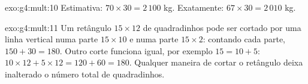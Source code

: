 \begin{solution}{exo:g4:mult:10}
Estimativa: $70 \times 30 = 2\,100$ kg. Exatamente:
$67 \times 30 = 2\,010$ kg.
\end{solution}

\begin{solution}{exo:g4:mult:11}
Um retângulo $15 \times 12$ de quadradinhos pode ser cortado por uma
linha vertical numa parte $15 \times 10$ e numa parte $15 \times 2$:
contando cada parte, $150 + 30 = 180$. Outro corte funciona igual,
por exemplo $15 = 10 + 5$: $10 \times 12 + 5 \times 12 = 120 + 60 =
180$. Qualquer maneira de cortar o retângulo deixa inalterado o
número total de quadradinhos.
\end{solution}
